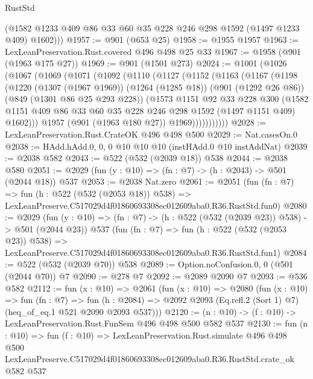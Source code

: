 \begin{lexlean}{RustStd}
\begin{coremodule}
        (@1582 @1233 @409 @86 @33 @60 @35 @228 @246 @298 @1592 (@1497 @1233 @409) @1602)))
@1957 := @901 (@653 @25)
@1958 := @1955 @1957
@1963 := LexLeanPreservation.Rust.covered @496 @498 @25 @33
@1967 := @1958 (@901 (@1963 @175 @27))
@1969 := @901 (@1501 @273)
@2024 := @1001
    (@1026
      (@1067
        (@1069
          (@1071
            (@1092
              (@1110
                (@1127
                  (@1152
                    (@1163
                      (@1167
                        (@1198
                          (@1220
                            (@1307 (@1967 @1969))
                            (@1264 (@1285 @18))
                            (@901 (@1292 @26 @86))
                            (@849 (@1301 @86 @25 @293 @228))
                            (@1573
                              @1151
                              @92
                              @33
                              @228
                              @300
                              (@1582
                                @1151
                                @409
                                @86
                                @33
                                @60
                                @35
                                @228
                                @246
                                @298
                                @1592
                                (@1497 @1151 @409)
                                @1602)))
                          @1957
                          (@901 (@1963 @180 @27))
                          @1969)))))))))))
@2028 := LexLeanPreservation.Rust.CrateOK @496 @498 @500
@2029 := Nat.casesOn.{0}
@2038 := HAdd.hAdd.{0, 0, 0} @10 @10 @10 (instHAdd.{0} @10 instAddNat)
@2039 := @2038 @582
@2043 := @522 (@532 (@2039 @18)) @538
@2044 := @2038 @580
@2051 := @2029 (fun (y : @10) => (fn : @7) -> (h : @2043) -> @501 (@2044 @18)) @537
@2053 := @2038 Nat.zero
@2061 := @2051
    (fun (fn : @7) =>
    fun (h : @522 (@532 (@2053 @18)) @538) =>
    LexLeanPreserve.C517029d4f01860693308ec012609aba0.R36.RustStd.fun0)
@2080 := @2029
    (fun (y : @10) => (fn : @7) -> (h : @522 (@532 (@2039 @23)) @538) -> @501 (@2044 @23))
    @537
    (fun (fn : @7) =>
    fun (h : @522 (@532 (@2053 @23)) @538) =>
    LexLeanPreserve.C517029d4f01860693308ec012609aba0.R36.RustStd.fun1)
@2084 := @522 (@532 (@2039 @70)) @538
@2089 := Option.noConfusion.{0, 0} (@501 (@2044 @70)) @7
@2090 := @278 @7
@2092 := @2089 @2090 @7
@2093 := @536 @582
@2112 := fun (x : @10) =>
  @2061
    (fun (x : @10) =>
    @2080
      (fun (x : @10) =>
      fun (fn : @7) =>
      fun (h : @2084) =>
      @2092 @2093 (Eq.refl.{2} (Sort 1) @7) (heq_of_eq.{1} @521 @2090 @2093 @537)))
@2120 := (n : @10) -> (f : @10) -> LexLeanPreservation.Rust.FunSem @496 @498 @500 @582 @537
@2130 := fun (n : @10) =>
  fun (f : @10) =>
  LexLeanPreservation.Rust.simulate
    @496
    @498
    @500
    LexLeanPreserve.C517029d4f01860693308ec012609aba0.R36.RustStd.crate_ok
    @582
    @537
\end{coremodule}
\end{lexlean}
